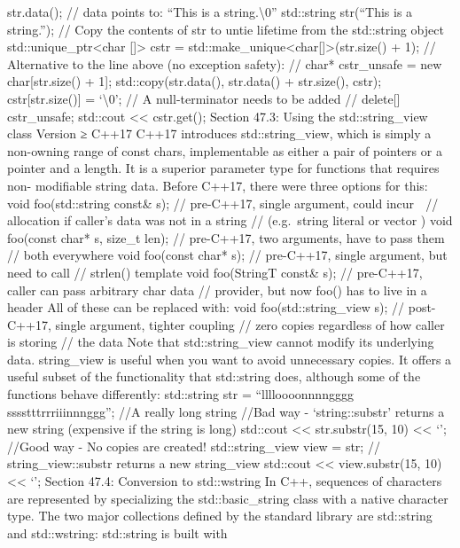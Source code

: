 str.data(); // data points to: ``This is a string.\textbackslash0''
std::string str(``This is a string.''); // Copy the contents of str to
untie lifetime from the std::string object
std::unique\_ptr\textless char {[}{]}\textgreater{} cstr =
std::make\_unique\textless char{[}{]}\textgreater(str.size() + 1); //
Alternative to the line above (no exception safety): // char*
cstr\_unsafe = new char{[}str.size() + 1{]}; std::copy(str.data(),
str.data() + str.size(), cstr); cstr{[}str.size(){]} =
`\textbackslash0'; // A null-terminator needs to be added //
delete{[}{]} cstr\_unsafe; std::cout \textless\textless{} cstr.get();
Section 47.3: Using the std::string\_view class Version ≥ C++17 C++17
introduces std::string\_view, which is simply a non-owning range of
const chars, implementable as either a pair of pointers or a pointer and
a length. It is a superior parameter type for functions that requires
non- modiﬁable string data. Before C++17, there were three options for
this: void foo(std::string const\& s); // pre-C++17, single argument,
could incur  // allocation if caller's data was not in a string //
(e.g.~string literal or vector ) void foo(const char* s, size\_t len);
// pre-C++17, two arguments, have to pass them // both everywhere void
foo(const char* s); // pre-C++17, single argument, but need to call //
strlen() template void foo(StringT const\& s); // pre-C++17, caller can
pass arbitrary char data // provider, but now foo() has to live in a
header All of these can be replaced with: void foo(std::string\_view s);
// post-C++17, single argument, tighter coupling // zero copies
regardless of how caller is storing // the data Note that
std::string\_view cannot modify its underlying data. string\_view is
useful when you want to avoid unnecessary copies. It oﬀers a useful
subset of the functionality that std::string does, although some of the
functions behave diﬀerently: std::string str = ``lllloooonnnngggg
sssstttrrriiinnnggg''; //A really long string //Bad way -
`string::substr' returns a new string (expensive if the string is long)
std::cout \textless\textless{} str.substr(15, 10) \textless\textless{}
`\n'; //Good way - No copies are created! std::string\_view view = str;
// string\_view::substr returns a new string\_view std::cout
\textless\textless{} view.substr(15, 10) \textless\textless{} `\n';
Section 47.4: Conversion to std::wstring In C++, sequences of characters
are represented by specializing the std::basic\_string class with a
native character type. The two major collections deﬁned by the standard
library are std::string and std::wstring: std::string is built with
